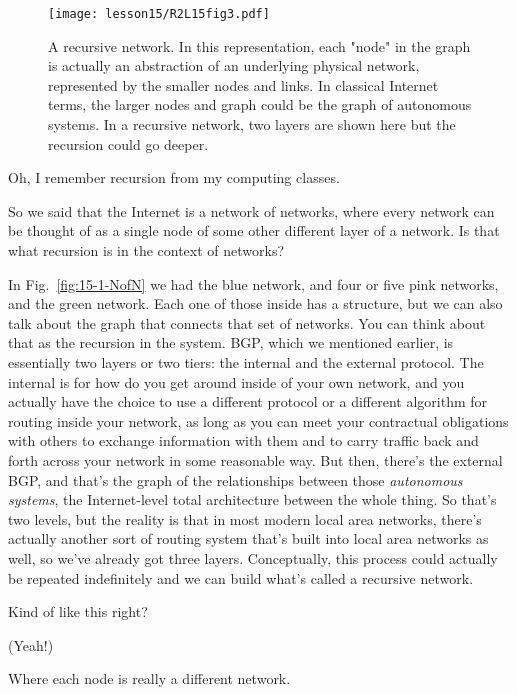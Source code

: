 \begin{figure}[t]
    \centering
    \texttt{[image: lesson15/R2L15fig3.pdf]}
    \caption[A recursive network]{A recursive network. In this representation, each "node" in the graph is actually an abstraction of an underlying physical network, represented by the smaller nodes and links. In classical Internet terms, the larger nodes and graph could be the graph of autonomous systems.  In a  recursive network, two layers are shown here but the recursion could go deeper.}
    \label{fig:15-3-recursive}
\end{figure}

\mmm Oh, I remember recursion from my computing classes.

So we said that the Internet is a network of networks, where every network can be thought of as a single node of some other different layer of a network. Is that what recursion is in the context of networks?

\rrr In Fig.~\ref{fig:15-1-NofN} we had the blue network, and four or five pink networks, and the green network. Each one of those inside has a structure, but we can also talk about the graph that connects that set of networks. You can think about that as the recursion in the system. BGP, which we mentioned earlier, is essentially two layers or two tiers: the internal and the external protocol. The internal is for how do you get around inside of your own network, and you actually have the choice to use a different protocol or a different algorithm for routing inside your network, as long as you can meet your contractual obligations with others to exchange information with them and to carry traffic back and forth across your network in some reasonable way. But then, there's the external BGP, and that's the graph of the relationships between those \emph{autonomous systems}, the Internet-level total architecture between the whole thing. So that's two levels, but the reality is that in most modern local area networks, there's actually another sort of routing system that's built into local area networks as well, so we've already got three layers. Conceptually, this process could actually be repeated indefinitely and we can build what's called a recursive network.

\mmm Kind of like this right? 

\rrr (Yeah!) 

\mmm Where each node is really a different network.

